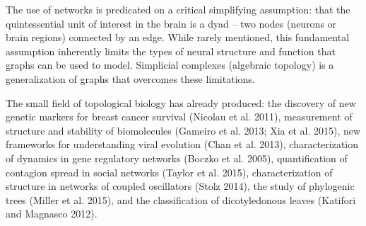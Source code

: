 \documentclass[onecollarge,runningheads]{svjour2}
\begin{document}
  

  




\citep{giusti2016two} The use of networks is predicated on a critical simplifying assumption: that the quintessential unit of interest in the brain is a dyad – two nodes (neurons or brain regions) connected by an edge. While rarely mentioned, this fundamental assumption inherently
limits the types of neural structure and function that graphs can be used to model. Simplicial complexes (algebraic topology) is a generalization of graphs that overcomes these limitations.








The small field of topological biology has already produced: the discovery of new genetic markers for breast cancer survival (Nicolau et al. 2011), measurement of structure and stability of biomolecules (Gameiro et al. 2013; Xia et al. 2015), new frameworks for understanding viral evolution (Chan et al. 2013), characterization of dynamics in gene regulatory networks (Boczko et al. 2005), quantification of contagion spread in social networks (Taylor et al. 2015), characterization of structure in networks of coupled oscillators (Stolz 2014), the study of phylogenic trees (Miller et al. 2015), and the classification of dicotyledonous leaves (Katifori and Magnasco 2012).




\end{document}
